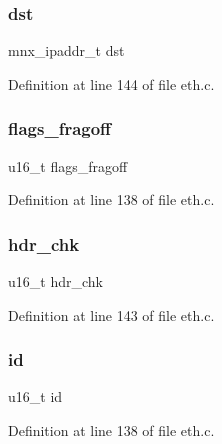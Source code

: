 \subsubsection{\texorpdfstring{dst}{dst}}
{\footnotesize\ttfamily mnx\+\_\+ipaddr\+\_\+t dst}



Definition at line 144 of file eth.\+c.

\hypertarget{struct__ip__hdr_a007d64973133a4a49edc1f3d10c574cf}{}\label{struct__ip__hdr_a007d64973133a4a49edc1f3d10c574cf} 
\subsubsection{\texorpdfstring{flags\+\_\+fragoff}{flags\_fragoff}}
{\footnotesize\ttfamily u16\+\_\+t flags\+\_\+fragoff}



Definition at line 138 of file eth.\+c.

\hypertarget{struct__ip__hdr_a3f27cc1bc3a730b9d6a9cdbf0ed1083f}{}\label{struct__ip__hdr_a3f27cc1bc3a730b9d6a9cdbf0ed1083f} 
\subsubsection{\texorpdfstring{hdr\+\_\+chk}{hdr\_chk}}
{\footnotesize\ttfamily u16\+\_\+t hdr\+\_\+chk}



Definition at line 143 of file eth.\+c.

\hypertarget{struct__ip__hdr_a68261cb70868a456b2a795021dbd2ec1}{}\label{struct__ip__hdr_a68261cb70868a456b2a795021dbd2ec1} 
\subsubsection{\texorpdfstring{id}{id}}
{\footnotesize\ttfamily u16\+\_\+t id}



Definition at line 138 of file eth.\+c.

\hypertarget{struct__ip__hdr_a09060d112d8a50530a426bc2d8b4294c}{}\label{struct__ip__hdr_a09060d112d8a50530a426bc2d8b4294c} 
